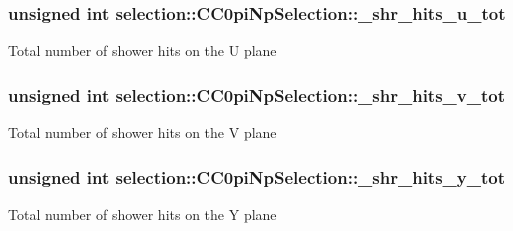 \subsubsection[{\texorpdfstring{\+\_\+shr\+\_\+hits\+\_\+u\+\_\+tot}{_shr_hits_u_tot}}]{\setlength{\rightskip}{0pt plus 5cm}unsigned int selection\+::\+C\+C0pi\+Np\+Selection\+::\+\_\+shr\+\_\+hits\+\_\+u\+\_\+tot\hspace{0.3cm}{\ttfamily [private]}}\hypertarget{classselection_1_1CC0piNpSelection_afba4a31f84c2f125323b90f007bda1c6}{}\label{classselection_1_1CC0piNpSelection_afba4a31f84c2f125323b90f007bda1c6}
Total number of shower hits on the U plane 
\subsubsection[{\texorpdfstring{\+\_\+shr\+\_\+hits\+\_\+v\+\_\+tot}{_shr_hits_v_tot}}]{\setlength{\rightskip}{0pt plus 5cm}unsigned int selection\+::\+C\+C0pi\+Np\+Selection\+::\+\_\+shr\+\_\+hits\+\_\+v\+\_\+tot\hspace{0.3cm}{\ttfamily [private]}}\hypertarget{classselection_1_1CC0piNpSelection_ab6aaf4282fa9d2e5971e162c66901227}{}\label{classselection_1_1CC0piNpSelection_ab6aaf4282fa9d2e5971e162c66901227}
Total number of shower hits on the V plane 
\subsubsection[{\texorpdfstring{\+\_\+shr\+\_\+hits\+\_\+y\+\_\+tot}{_shr_hits_y_tot}}]{\setlength{\rightskip}{0pt plus 5cm}unsigned int selection\+::\+C\+C0pi\+Np\+Selection\+::\+\_\+shr\+\_\+hits\+\_\+y\+\_\+tot\hspace{0.3cm}{\ttfamily [private]}}\hypertarget{classselection_1_1CC0piNpSelection_a6a43c3523af47860ad1682ebe14bb8e3}{}\label{classselection_1_1CC0piNpSelection_a6a43c3523af47860ad1682ebe14bb8e3}
Total number of shower hits on the Y plane 
